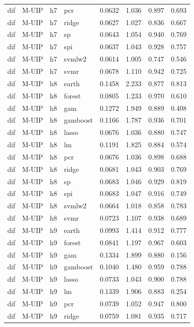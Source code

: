 \begin{ThreePartTable}
\begin{longtable}[t]{llclcccc}
dif & M-UIP & h7 & pcr & 0.0632 & 1.036 & 0.897 & 0.693\\
dif & M-UIP & h7 & ridge & 0.0627 & 1.027 & 0.836 & 0.667\\
dif & M-UIP & h7 & sp & 0.0643 & 1.054 & 0.940 & 0.769\\
dif & M-UIP & h7 & spi & 0.0637 & 1.043 & 0.928 & 0.757\\
dif & M-UIP & h7 & svmlw2 & 0.0614 & 1.005 & 0.747 & 0.546\\
dif & M-UIP & h7 & svmr & 0.0678 & 1.110 & 0.942 & 0.725\\
\addlinespace
dif & M-UIP & h8 & earth & 0.1458 & 2.233 & 0.877 & 0.813\\
dif & M-UIP & h8 & forest & 0.0805 & 1.233 & 0.970 & 0.610\\
dif & M-UIP & h8 & gam & 0.1272 & 1.949 & 0.889 & 0.408\\
dif & M-UIP & h8 & gamboost & 0.1166 & 1.787 & 0.936 & 0.701\\
dif & M-UIP & h8 & lasso & 0.0676 & 1.036 & 0.880 & 0.747\\
dif & M-UIP & h8 & lm & 0.1191 & 1.825 & 0.884 & 0.574\\
dif & M-UIP & h8 & pcr & 0.0676 & 1.036 & 0.898 & 0.688\\
dif & M-UIP & h8 & ridge & 0.0681 & 1.043 & 0.903 & 0.769\\
dif & M-UIP & h8 & sp & 0.0683 & 1.046 & 0.929 & 0.819\\
dif & M-UIP & h8 & spi & 0.0683 & 1.047 & 0.916 & 0.749\\
dif & M-UIP & h8 & svmlw2 & 0.0664 & 1.018 & 0.858 & 0.783\\
dif & M-UIP & h8 & svmr & 0.0723 & 1.107 & 0.938 & 0.689\\
\addlinespace
dif & M-UIP & h9 & earth & 0.0993 & 1.414 & 0.912 & 0.777\\
dif & M-UIP & h9 & forest & 0.0841 & 1.197 & 0.967 & 0.603\\
dif & M-UIP & h9 & gam & 0.1334 & 1.899 & 0.880 & 0.156\\
dif & M-UIP & h9 & gamboost & 0.1040 & 1.480 & 0.959 & 0.788\\
dif & M-UIP & h9 & lasso & 0.0733 & 1.043 & 0.900 & 0.788\\
dif & M-UIP & h9 & lm & 0.1339 & 1.906 & 0.883 & 0.254\\
dif & M-UIP & h9 & pcr & 0.0739 & 1.052 & 0.947 & 0.800\\
dif & M-UIP & h9 & ridge & 0.0759 & 1.081 & 0.935 & 0.717\\

\end{longtable}
\end{ThreePartTable}

